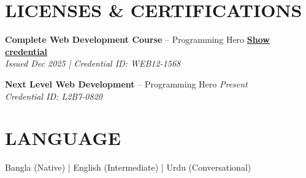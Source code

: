 \documentclass[a4paper,14pt]{extarticle}
\begin{document}
\section{LICENSES \& CERTIFICATIONS}
\small
\textbf{Complete Web Development Course} – Programming Hero \hfill \href{https://drive.google.com/file/d/1nZyMq2PHUmZ-jAfhEY0d0lX6e8UqdGpd/view}{\textbf{Show credential}} \\
\textit{Issued Dec 2025 \quad | \quad Credential ID: WEB12-1568}
\vspace{0.5mm}

\textbf{Next Level Web Development} – Programming Hero \hfill \textit{Present} \\
\textit{Credential ID: L2B7-0820}
\vspace{0.5mm}

\section{LANGUAGE}
\small
Bangla (Native) \quad | \quad English (Intermediate) \quad | \quad Urdu (Conversational)
\end{document}
